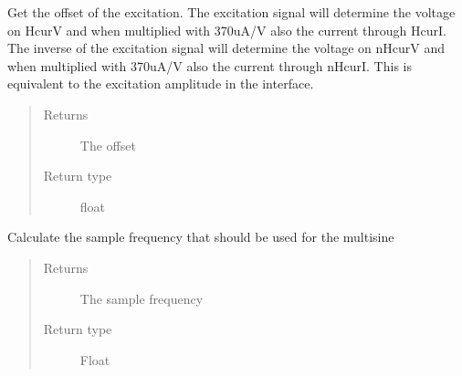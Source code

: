 \documentclass[letterpaper,10pt,english]{sphinxmanual}
\begin{document}
\begin{fulllineitems}
\begin{fulllineitems}
\end{fulllineitems}


\begin{fulllineitems}
\label{\detokenize{index:TiePieLCR_settings.TiePieLCR_settings.get_gen_offset}}
\sphinxAtStartPar
Get the offset of the excitation. The excitation signal will determine the voltage on HcurV and when multiplied with 370uA/V also the current through HcurI. The inverse of the excitation signal will determine the voltage on nHcurV and when multiplied with 370uA/V also the current through nHcurI. This is equivalent to the excitation amplitude in the interface.
\begin{quote}\begin{description}
\item[{Returns}] \leavevmode
\sphinxAtStartPar
The offset

\item[{Return type}] \leavevmode
\sphinxAtStartPar
float

\end{description}\end{quote}

\end{fulllineitems}


\begin{fulllineitems}
\label{\detokenize{index:TiePieLCR_settings.TiePieLCR_settings.get_gen_sample_freq}}
\sphinxAtStartPar
Calculate the sample frequency that should be used for the multisine
\begin{quote}\begin{description}
\item[{Returns}] \leavevmode
\sphinxAtStartPar
The sample frequency

\item[{Return type}] \leavevmode
\sphinxAtStartPar
Float

\end{description}\end{quote}


\end{fulllineitems}
\end{fulllineitems}
\end{document}
